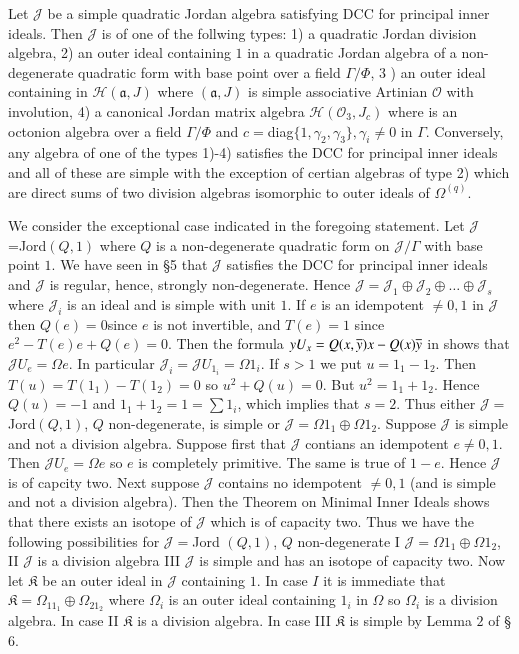 \noindent
{ Let $\mathscr{J}$ be  a simple
  quadratic Jordan algebra satisfying DCC for principal inner
  ideals. Then $\mathscr{J}$ is of one of the follwing types: 1) a
  quadratic Jordan division algebra, 2) an outer ideal containing $1$
  in a quadratic Jordan algebra of a non-degenerate quadratic form
  with base point over a field $\Gamma/\Phi$, $3$ ) an outer ideal
  containing in $\mathscr{H}(\mathfrak{a},J)$ where $(\mathfrak{a},J)$
  is simple associative Artinian $\mathcal{O}$ with involution, 4) a
  canonical Jordan matrix algebra $\mathscr{H}(\mathcal{O}_3,J_c)$
  where is an octonion algebra over a field $\Gamma/\Phi$ and
  $c=$diag$\{1,\gamma_2,\gamma_3\}, \gamma_i\neq 0$ in
  $\Gamma$. Conversely, any algebra of one of the types 1)-4)
  satisfies the DCC for principal inner ideals and all of these are
  simple with the exception of certian algebras of type 2) which are
  direct sums of two division algebras isomorphic to outer ideals of
  $\Omega^{(q)}$.

We consider the exceptional case indicated in the foregoing
statement. Let $\mathscr{J}$=Jord$(Q,1)$ where $Q$ is a non-degenerate
quadratic form on $\mathscr{J}/\Gamma$ with base point $1$. We have
seen in \S 5 that $\mathscr{J}$ satisfies the DCC for principal inner
ideals and $\mathscr{J}$ is regular, hence, strongly
non-degenerate. Hence $\mathscr{J}=\mathscr{J}_1\oplus
\mathscr{J}_2\oplus\ldots \oplus \mathscr{J}_s$ where $\mathscr{J}_i$
is an ideal and is simple with unit $1$. If $e$ is an idempotent $\neq
0, 1$ in $\mathscr{J}$ then $Q(e)=0$\pageoriginale since $e$ is not invertible, and
$T(e)=1$ since $e^{2}-T(e)e+Q(e)=0$. Then the formula
$yU_x=Q(x,\overline{y})x-Q(x)\overline{y}$ in shows that $\mathscr{J} U_e=\Omega
e$. In particular $\mathscr{J}_i=\mathscr{J}U_{1_i}=\Omega 1_i$. If
$s> 1$ we put $u=1_1-1_2$. Then $T(u)=T(1_1)-T(1_2)=0$ so
$u^{2}+Q(u)=0$. But $u^{2}=1_1+1_2$. Hence $Q(u)=-1$ and
$1_1+1_2=1=\sum1_i$, which implies that $s=2$. Thus either
$\mathscr{J}=$Jord$(Q,1)$, $Q$ non-degenerate, is  simple or
$\mathscr{J}=\Omega 1_1\oplus \Omega 1_2$. Suppose $\mathscr{J}$ is
simple and not a division algebra. Suppose first that $\mathscr{J}$
contians an idempotent $e\neq 0,1$. Then $\mathscr{J}U_e=\Omega e$ so
$e$ is completely primitive. The same is true of $1-e$. Hence
$\mathscr{J}$ is of capcity two. Next suppose $\mathscr{J}$ contains
no idempotent $\neq 0,1$ (and is simple and not a division
algebra). Then the Theorem on Minimal Inner Ideals shows that there
exists an isotope of $\mathscr{J}$ which is of capacity two. Thus we
have the following possibilities for $\mathscr{J}=$Jord $(Q,1)$, $Q$
non-degenerate I $\mathscr{J} =\Omega 1_1\oplus \Omega 1_2$, II $\mathscr{J}$ is a
division algebra III $\mathscr{J}$ is simple and has an isotope of
capacity two. Now let $\mathfrak{K}$ be an outer ideal in
$\mathscr{J}$ containing $1$. In case $I$ it is immediate that
$\mathfrak{K}=\Omega_11_1\oplus \Omega_21_2$ where $\Omega_i$ is an
outer ideal containing $1_i$ in $\Omega$ so $\Omega_i$ is a division
algebra. In case II $\mathfrak{K}$ is a division algebra. In case III
$\mathfrak{K}$ is simple by Lemma $2$ of \S $6$.


}
